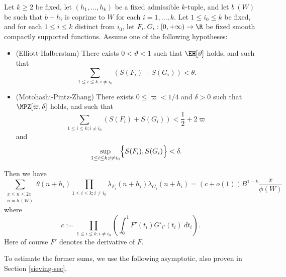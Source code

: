 \begin{theorem}\label{prime-asym}  Let $k \geq 2$ be fixed, let $(h_1,\dots,h_k)$ be a fixed admissible $k$-tuple, and let $b\ (W)$ be such that $b+h_i$ is coprime to $W$ for each $i=1,\dots,k$.  Let $1 \leq i_0 \leq k$ be fixed, and for each $1 \leq i \leq k$ distinct from $i_0$, let $F_{i}, G_{i}: [0,+\infty) \to \R$ be fixed smooth compactly supported functions.  Assume one of the following hypotheses:
\begin{itemize}
\item[(i)]  (Elliott-Halberstam) There exists $0 < \vartheta < 1$ such that $\EH[\vartheta]$ holds, and such that 
\begin{equation}\label{fg-upper}
\sum_{1 \leq i \leq k; i \neq i_0} ( S(F_{i}) + S(G_{i}) ) < \theta.
\end{equation}
\item[(ii)]  (Motohashi-Pintz-Zhang) There exists $0 \leq \varpi < 1/4$ and $\delta > 0$ such that $\MPZ[\varpi,\delta]$ holds, and such that
\begin{equation}\label{fg-upper-alt}
\sum_{1 \leq i \leq k; i \neq i_0} ( S(F_{i}) + S(G_{i}) ) < \frac{1}{2} + 2 \varpi
\end{equation}
and
\begin{equation}
\sup_{1 \leq i \leq k; i \neq i_0} \Bigl\{S(F_{i}), S(G_{i}) \Bigr\}< \delta.
\end{equation}
\end{itemize}
Then we have
\begin{equation}\label{theta-oo}
 \sum_{\substack{x \leq n \leq 2x\\ n = b\ (W)}} \theta(n+h_i) \prod_{1 \leq i \leq k; i \neq i_0} \lambda_{F_{i}}(n+h_{i}) \lambda_{G_{i}}(n+h_{i}) = 
(c+o(1)) B^{1-k} \frac{x}{\phi(W)}
\end{equation}
where
$$ c := \prod_{1 \leq i \leq k; i \neq i_0} \left(\int_0^1 F'(t_{i}) G'_{i'}(t_{i})\ dt_{i}\right).$$
Here of course $F'$ denotes the derivative of $F$.
\end{theorem}


To estimate the former sums, we use the following asymptotic, also proven in Section \ref{sieving-sec}.

